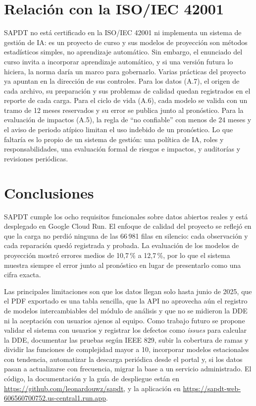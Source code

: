 \documentclass[conference]{IEEEtran}
\begin{document}
\section{Relación con la ISO/IEC 42001}\label{sec:42001}
SAPDT no está certificado en la ISO/IEC 42001 ni implementa un sistema de gestión de IA: es un proyecto de curso y sus modelos de proyección son métodos estadísticos simples, no aprendizaje automático. Sin embargo, el enunciado del curso invita a incorporar aprendizaje automático, y si una versión futura lo hiciera, la norma daría un marco para gobernarlo. Varias prácticas del proyecto ya apuntan en la dirección de sus controles. Para los datos (A.7), el origen de cada archivo, su preparación y sus problemas de calidad quedan registrados en el reporte de cada carga. Para el ciclo de vida (A.6), cada modelo se valida con un tramo de 12 meses reservados y su error se publica junto al pronóstico. Para la evaluación de impactos (A.5), la regla de ``no confiable'' con menos de 24 meses y el aviso de periodo atípico limitan el uso indebido de un pronóstico. Lo que faltaría es lo propio de un sistema de gestión: una política de IA, roles y responsabilidades, una evaluación formal de riesgos e impactos, y auditorías y revisiones periódicas.

\section{Conclusiones}\label{sec:conclusiones}
SAPDT cumple los ocho requisitos funcionales sobre datos abiertos reales y está desplegado en Google Cloud Run. El enfoque de calidad del proyecto se reflejó en que la carga no perdió ninguna de las 66\,981 filas en silencio: cada observación y cada reparación quedó registrada y probada. La evaluación de los modelos de proyección mostró errores medios de 10,7\,\% a 12,7\,\%, por lo que el sistema muestra siempre el error junto al pronóstico en lugar de presentarlo como una cifra exacta.

Las principales limitaciones son que los datos llegan solo hasta junio de 2025, que el PDF exportado es una tabla sencilla, que la API no aprovecha aún el registro de modelos intercambiables del módulo de análisis y que no se midieron la DDE ni la aceptación con usuarios ajenos al equipo. Como trabajo futuro se propone validar el sistema con usuarios y registrar los defectos como \textit{issues} para calcular la DDE, documentar las pruebas según IEEE 829, subir la cobertura de ramas y dividir las funciones de complejidad mayor a 10, incorporar modelos estacionales con tendencia, automatizar la descarga periódica desde el portal y, si los datos pasan a actualizarse con frecuencia, migrar la base a un servicio administrado. El código, la documentación y la guía de despliegue están en \url{https://github.com/leonardouwz/sapdt}, y la aplicación en \url{https://sapdt-web-606560700752.us-central1.run.app}.
\end{document}

